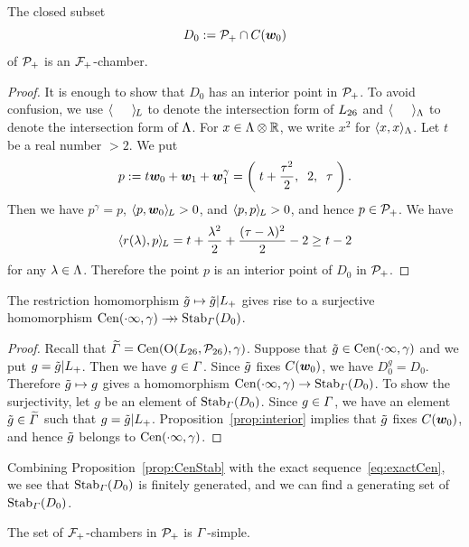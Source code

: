 \documentclass{amsart} %
\begin{document}
%
%
\begin{proposition}\label{prop:D0}
The closed subset 
\[
D_0:=\mathord{\mathcal{P}}_{+}\cap \mathord{C}(\boldsymbol{w}_0)
\]
of $\mathord{\mathcal{P}}_{+}$ is an $\mathord{\mathcal{F}}_{+}$-chamber.
\end{proposition}
%
\begin{proof}
It is enough to show that $D_0$ has an interior point in $\mathord{\mathcal{P}}_{+}$.
To avoid confusion, we use $\langle \phantom{a, a} \rangle_{\hskip -1pt L}$ to denote the intersection form of $L_{26}$
and $\langle \phantom{a, a} \rangle_{\Lambda}$ to denote the intersection form of $\Lambda$.
For $x\in \Lambda\otimes\mathord{\mathbb{R}}$, we write $x^2$ for $\langle x,x \rangle_{\Lambda}$.
Let $t$ be a real number $>2$.
We put
\[
p:=t\boldsymbol{w}_0+\boldsymbol{w}_1+\boldsymbol{w}_1^{\gamma}=\left(\; t+\frac{\tau^2}{2}, \;\;2, \;\; \tau\;\right).
\]
%
Then we have $p^{\gamma}=p$, $\langle p, \boldsymbol{w}_0 \rangle_{\hskip -1pt L}>0$, and $\langle p, p \rangle_{\hskip -1pt L}>0$,
and hence $p\in \mathord{\mathcal{P}}_{+}$.
We have 
\[
\langle r(\lambda), p \rangle_{\hskip -1pt L}=t+\frac{\lambda^2}{2}+\frac{(\tau-\lambda)^2}{2}-2\ge t-2
\]
for any $\lambda\in \Lambda$.
Therefore the point $p$ is an interior point of $D_0$ in $\mathord{\mathcal{P}}_{+}$.
\end{proof}
%
\begin{proposition}\label{prop:CenStab}
The restriction homomorphism
$\tilde{g}\mapsto \tilde{g}|L_{+}$
gives rise to a surjective homomorphism 
$\mathrm{Cen}(\cdot \infty, \gamma)\mathrel{\rightarrow\!\!\!\!\rightarrow} \operatorname{Stab}_{\varGamma}(D_0)$.
\end{proposition}
%
\begin{proof}
Recall that 
$\widetilde{\varGamma}=\mathrm{Cen}(\mathord{\mathrm{O}}(L_{26}, \mathord{\mathcal{P}}_{26}), \gamma)$.
Suppose that $\tilde{g}\in \mathrm{Cen}(\cdot \infty, \gamma)$
and we put $g=\tilde{g}|L_{+}$.
Then we have  $g\in \varGamma$.
Since $\tilde{g}$ fixes $\mathord{C}(\boldsymbol{w}_0)$,
we have $D_0^g=D_0$.
Therefore $\tilde{g}\mapsto g$ gives a homomorphism 
$\mathrm{Cen}(\cdot \infty, \gamma)\to\operatorname{Stab}_{\varGamma}(D_0)$.
To show the surjectivity,
let $g$ be an element of $\operatorname{Stab}_{\varGamma}(D_0)$.
Since $g\in \varGamma$,
we have an element $\tilde{g}\in \widetilde{\varGamma}$ such that $g=\tilde{g}|L_{+}$.
Proposition~\ref{prop:interior} implies that $\tilde{g}$ fixes $\mathord{C}(\boldsymbol{w}_0)$,
and hence $\tilde{g}$ belongs to $\mathrm{Cen}(\cdot \infty, \gamma)$.
\end{proof}
%
%
Combining Proposition~\ref{prop:CenStab} with the exact sequence~\eqref{eq:exactCen}, we see that 
$\operatorname{Stab}_{\varGamma}(D_0)$ is finitely generated,
and we can find a generating set  of $\operatorname{Stab}_{\varGamma}(D_0)$.
%
\begin{proposition}\label{prop:PhiSimple}
The set of $\mathord{\mathcal{F}}_{+}$-chambers in $\mathord{\mathcal{P}}_{+}$ is $\varGamma$-simple.
\end{proposition}
%
\end{document}
